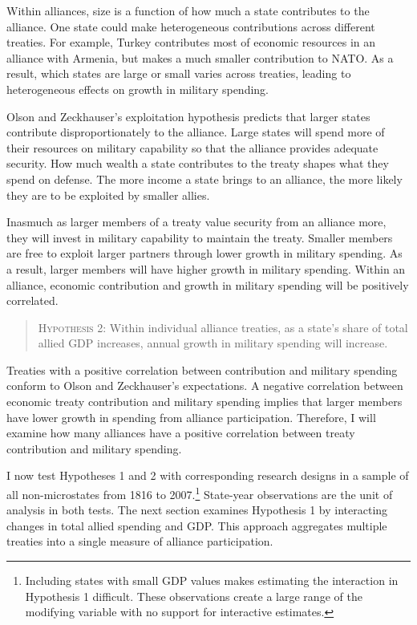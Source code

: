 \documentclass[12pt]{article}
\begin{document}
 
Within alliances, size is a function of how much a state contributes to the alliance.
One state could make heterogeneous contributions across different treaties. 
For example, Turkey contributes most of economic resources in an alliance with Armenia, but makes a much smaller contribution to NATO. 
As a result, which states are large or small varies across treaties, leading to heterogeneous effects on growth in military spending. 


Olson and Zeckhauser's exploitation hypothesis predicts that larger states contribute disproportionately to the alliance. 
Large states will spend more of their resources on military capability so that the alliance provides adequate security. 
How much wealth a state contributes to the treaty shapes what they spend on defense. 
The more income a state brings to an alliance, the more likely they are to be exploited by smaller allies. 


Inasmuch as larger members of a treaty value security from an alliance more, they will invest in military capability to maintain the treaty.
Smaller members are free to exploit larger partners through lower growth in military spending. 
As a result, larger members will have higher growth in military spending. 
Within an alliance, economic contribution and growth in military spending will be positively correlated. 


\begin{quote}
\textsc{Hypothesis 2}: Within individual alliance treaties, as a state's share of total allied GDP increases, annual growth in military spending will increase. 
\end{quote}


Treaties with a positive correlation between contribution and military spending conform to Olson and Zeckhauser's expectations. 
A negative correlation between economic treaty contribution and military spending implies that larger members have lower growth in spending from alliance participation. 
Therefore, I will examine how many alliances have a positive correlation between treaty contribution and military spending.  


I now test Hypotheses 1 and 2 with corresponding research designs in a sample of all non-microstates from 1816 to 2007.\footnote{Including states with small GDP values makes estimating the interaction in Hypothesis 1 difficult. These observations create a large range of the modifying variable with no support for interactive estimates.}
State-year observations are the unit of analysis in both tests.  
The next section examines Hypothesis 1 by interacting changes in total allied spending and GDP.
This approach aggregates multiple treaties into a single measure of alliance participation. 
\end{document}

